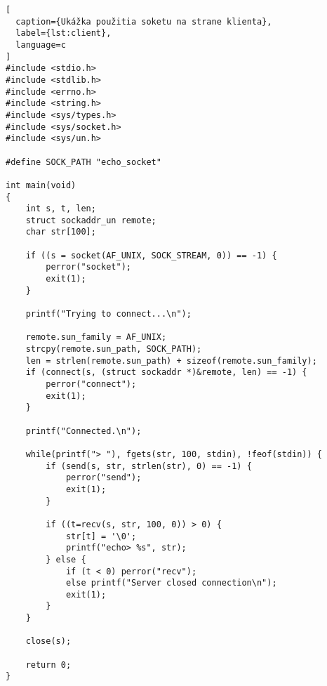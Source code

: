 \begin{lstlisting}[
  caption={Ukážka použitia soketu na strane klienta},
  label={lst:client},
  language=c
]
#include <stdio.h>
#include <stdlib.h>
#include <errno.h>
#include <string.h>
#include <sys/types.h>
#include <sys/socket.h>
#include <sys/un.h>

#define SOCK_PATH "echo_socket"

int main(void)
{
    int s, t, len;
    struct sockaddr_un remote;
    char str[100];

    if ((s = socket(AF_UNIX, SOCK_STREAM, 0)) == -1) {
        perror("socket");
        exit(1);
    }

    printf("Trying to connect...\n");

    remote.sun_family = AF_UNIX;
    strcpy(remote.sun_path, SOCK_PATH);
    len = strlen(remote.sun_path) + sizeof(remote.sun_family);
    if (connect(s, (struct sockaddr *)&remote, len) == -1) {
        perror("connect");
        exit(1);
    }

    printf("Connected.\n");

    while(printf("> "), fgets(str, 100, stdin), !feof(stdin)) {
        if (send(s, str, strlen(str), 0) == -1) {
            perror("send");
            exit(1);
        }

        if ((t=recv(s, str, 100, 0)) > 0) {
            str[t] = '\0';
            printf("echo> %s", str);
        } else {
            if (t < 0) perror("recv");
            else printf("Server closed connection\n");
            exit(1);
        }
    }

    close(s);

    return 0;
}
\end{lstlisting}